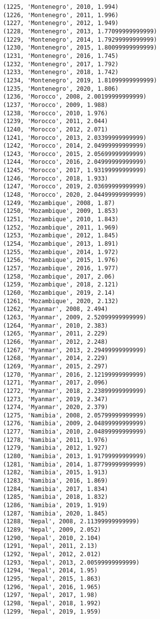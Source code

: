\documentclass[11pt]{article}
\begin{document}
\begin{Verbatim}[commandchars=\\\{\}]
(1225, 'Montenegro', 2010, 1.994)
(1226, 'Montenegro', 2011, 1.996)
(1227, 'Montenegro', 2012, 1.949)
(1228, 'Montenegro', 2013, 1.77099999999999)
(1229, 'Montenegro', 2014, 1.79299999999999)
(1230, 'Montenegro', 2015, 1.80099999999999)
(1231, 'Montenegro', 2016, 1.745)
(1232, 'Montenegro', 2017, 1.792)
(1233, 'Montenegro', 2018, 1.742)
(1234, 'Montenegro', 2019, 1.81099999999999)
(1235, 'Montenegro', 2020, 1.806)
(1236, 'Morocco', 2008, 2.00199999999999)
(1237, 'Morocco', 2009, 1.988)
(1238, 'Morocco', 2010, 1.976)
(1239, 'Morocco', 2011, 2.044)
(1240, 'Morocco', 2012, 2.071)
(1241, 'Morocco', 2013, 2.03399999999999)
(1242, 'Morocco', 2014, 2.04999999999999)
(1243, 'Morocco', 2015, 2.05699999999999)
(1244, 'Morocco', 2016, 2.04999999999999)
(1245, 'Morocco', 2017, 1.93199999999999)
(1246, 'Morocco', 2018, 1.933)
(1247, 'Morocco', 2019, 2.03699999999999)
(1248, 'Morocco', 2020, 2.04499999999999)
(1249, 'Mozambique', 2008, 1.87)
(1250, 'Mozambique', 2009, 1.853)
(1251, 'Mozambique', 2010, 1.843)
(1252, 'Mozambique', 2011, 1.969)
(1253, 'Mozambique', 2012, 1.845)
(1254, 'Mozambique', 2013, 1.891)
(1255, 'Mozambique', 2014, 1.972)
(1256, 'Mozambique', 2015, 1.976)
(1257, 'Mozambique', 2016, 1.977)
(1258, 'Mozambique', 2017, 2.06)
(1259, 'Mozambique', 2018, 2.121)
(1260, 'Mozambique', 2019, 2.14)
(1261, 'Mozambique', 2020, 2.132)
(1262, 'Myanmar', 2008, 2.494)
(1263, 'Myanmar', 2009, 2.52099999999999)
(1264, 'Myanmar', 2010, 2.383)
(1265, 'Myanmar', 2011, 2.229)
(1266, 'Myanmar', 2012, 2.248)
(1267, 'Myanmar', 2013, 2.29499999999999)
(1268, 'Myanmar', 2014, 2.229)
(1269, 'Myanmar', 2015, 2.297)
(1270, 'Myanmar', 2016, 2.12199999999999)
(1271, 'Myanmar', 2017, 2.096)
(1272, 'Myanmar', 2018, 2.23899999999999)
(1273, 'Myanmar', 2019, 2.347)
(1274, 'Myanmar', 2020, 2.379)
(1275, 'Namibia', 2008, 2.05799999999999)
(1276, 'Namibia', 2009, 2.04899999999999)
(1277, 'Namibia', 2010, 2.04899999999999)
(1278, 'Namibia', 2011, 1.976)
(1279, 'Namibia', 2012, 1.927)
(1280, 'Namibia', 2013, 1.91799999999999)
(1281, 'Namibia', 2014, 1.87799999999999)
(1282, 'Namibia', 2015, 1.913)
(1283, 'Namibia', 2016, 1.869)
(1284, 'Namibia', 2017, 1.834)
(1285, 'Namibia', 2018, 1.832)
(1286, 'Namibia', 2019, 1.919)
(1287, 'Namibia', 2020, 1.845)
(1288, 'Nepal', 2008, 2.11399999999999)
(1289, 'Nepal', 2009, 2.052)
(1290, 'Nepal', 2010, 2.104)
(1291, 'Nepal', 2011, 2.13)
(1292, 'Nepal', 2012, 2.012)
(1293, 'Nepal', 2013, 2.00599999999999)
(1294, 'Nepal', 2014, 1.95)
(1295, 'Nepal', 2015, 1.863)
(1296, 'Nepal', 2016, 1.965)
(1297, 'Nepal', 2017, 1.98)
(1298, 'Nepal', 2018, 1.992)
(1299, 'Nepal', 2019, 1.959)

\end{Verbatim}
\end{document}
